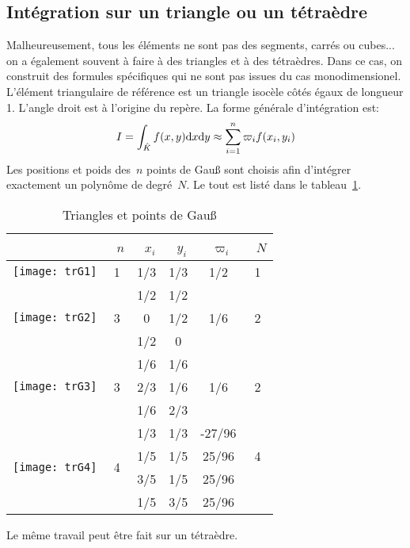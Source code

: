 \medskip
\subsection*{Intégration sur un triangle ou un tétraèdre} 

Malheureusement, tous les éléments ne sont pas des segments, carrés ou cubes... on a également souvent à faire à des triangles et à des tétraèdres. Dans ce cas, on construit des formules spécifiques qui ne sont pas issues du cas monodimensionel. L'élément triangulaire de référence est un triangle isocèle côtés égaux de longueur 1. L'angle droit est à l'origine du repère. La forme générale d'intégration est: 
\begin{equation}
 I=\int_{\hat{K}} f(x,y)\text{d} x\text{d} y \approx \sum_{i=1}^n \varpi_if(x_i,y_i) 
\end{equation}
Les positions et poids des~$n$ points de Gauß sont choisis afin d'intégrer exactement un polynôme de degré~$N$. Le tout est listé dans le tableau~\ref{tab:IntNum:TriGauss}.
\begin{table}[ht]\centering
\begin{tabular}{cccccc}
 &~$n$ &~$x_i$ &~$y_i$ &~$\varpi_i$ &~$N$\\ \hline 
 \texttt{[image: trG1]} & 1 & 1/3 & 1/3 & 1/2 & 1\\ \hline 
 \multirow{3}{*}{\texttt{[image: trG2]}} & \multirow{3}{*}{3} & 1/2 & 1/2 & \multirow{3}{*}{1/6} & \multirow{3}{*}{2}\\[+2mm] 
 &&0&1/2&&\\[+2mm] 
 &&1/2&0&&\\[+12mm] \hline 
 \multirow{3}{*}{\texttt{[image: trG3]}} & \multirow{3}{*}{3} & 1/6 & 1/6 & \multirow{3}{*}{1/6} & \multirow{3}{*}{2}\\[+2mm] 
 &&2/3 & 1/6 &&\\[+2mm] 
 &&1/6&2/3&&\\[+12mm] \hline 
 \multirow{4}{*}{\texttt{[image: trG4]}} & \multirow{4}{*}{4} & 1/3 & 1/3 & -27/96 & \multirow{3}{*}{4}\\[+2mm] 
 &&1/5&1/5&25/96&\\[+2mm] 
 &&3/5&1/5&25/96&\\[+2mm] 
 &&1/5&3/5&25/96&\\[+12mm] 
\end{tabular} 
\caption{Triangles et points de Gauß}\label{tab:IntNum:TriGauss}
\end{table} 
 Le même travail peut être fait sur un tétraèdre. 